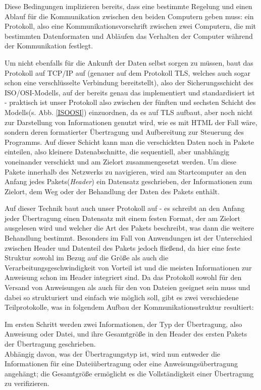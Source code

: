 Diese Bedingungen implizieren bereits, dass eine bestimmte Regelung und einen Ablauf für die Kommunikation zwischen den beiden Computern geben muss: ein Protokoll, also eine Kommunikationsvorschrift zwischen zwei Computern, die mit bestimmten Datenformaten und Abläufen das Verhalten der Computer während der Kommunikation festlegt.\par
Um nicht ebenfalls für die Ankunft der Daten selbst sorgen zu müssen, baut das Protokoll auf TCP/IP auf (genauer auf dem Protokoll TLS, welches auch sogar schon eine verschlüsselte Verbindung bereitstellt), also der Sicherungsschicht des ISO/OSI-Modells, auf der bereits genau das implementiert und standardisiert ist - praktisch ist unser Protokoll also zwischen der fünften und sechsten Schicht des Modells(s. Abb. \ref{ISOOSI}) einzuordnen, da es auf TLS aufbaut, aber noch nicht zur Darstellung von Informationen genutzt wird, wie es mit HTML der Fall wäre, sondern deren formatierter Übertragung und Aufbereitung zur Steuerung des Programms.
Auf dieser Schicht kann man die verschickten Daten noch in Pakete einteilen, also kleinere Datenabschnitte, die sequentiell, aber unabhängig voneinander verschickt und am Zielort zusammengesetzt werden.
Um diese Pakete innerhalb des Netzwerks zu navigieren, wird am Startcomputer an den Anfang jedes Pakets(\textit{Header}) ein Datensatz geschrieben, der Informationen zum Zielort, dem Weg oder der Behandlung der Daten des Pakets enthält.\par 
Auf dieser Technik baut auch unser Protokoll auf - es schreibt an den Anfang jeder Übertragung einen Datensatz mit einem festen Format, der am Zielort ausgelesen wird und welcher die Art des Pakets beschreibt, was dann die weitere Behandlung bestimmt.
Besonders im Fall von Anwendungen ist der Unterschied zwischen Header und Datenteil des Pakets jedoch fließend, da hier eine feste Struktur sowohl im Bezug auf die Größe als auch die Verarbeitungsgeschwindigkeit von Vorteil ist und die meisten Informationen zur Anweisung schon im Header integriert sind.
Da das Protokoll sowohl für den Versand von Anweisungen als auch für den von Dateien geeignet sein muss und dabei so strukturiert und einfach wie möglich soll, gibt es zwei verschiedene Teilprotokolle, was in folgendem Aufbau der Kommunikationsstruktur resultiert:\par
Im ersten Schritt werden zwei Informationen, der Typ der Übertragung, also Anweisung oder Datei, und ihre Gesamtgröße in den Header des ersten Pakets der Übertragung geschrieben.\\
Abhängig davon, was der Übertragungstyp ist, wird nun entweder die Informationen für eine Dateiübertragung oder eine Anweisungsübertragung angehängt; die Gesamtgröße ermöglicht es die Vollständigkeit einer Übertragung zu verifizieren.
